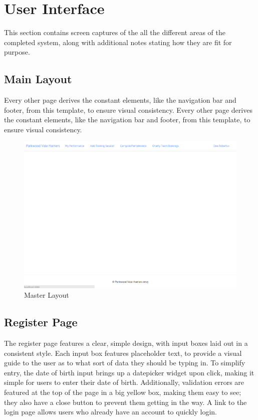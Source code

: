 \documentclass{article}[12pt,a4paper]
\begin{document}
\section{User Interface}
This section contains screen captures of the all the different areas of the completed system, along with additional notes stating how they are fit for purpose.

\subsection{Main Layout}
Every other page derives the constant elements, like the navigation bar and footer, from this template, to ensure visual consistency. Every other page derives the constant elements, like the navigation bar and footer, from this template, to ensure visual consistency. 

\begin{figure}[h!]
  \includegraphics[scale=0.30]{final_ui/layout}
  \caption{Master Layout}
\end{figure}

\subsection{Register Page}
The register page features a clear, simple design, with input boxes laid out in a consistent style. Each input box features placeholder text, to provide a visual guide to the user as to what sort of data they should be typing in. To simplify entry, the date of birth input brings up a datepicker widget upon click, making it simple for users to enter their date of birth. Additionally, validation errors are featured at the top of the page in a big yellow box, making them easy to see; they also have a close button to prevent them getting in the way. A link to the login page allows users who already have an account to quickly login.
\end{document}

